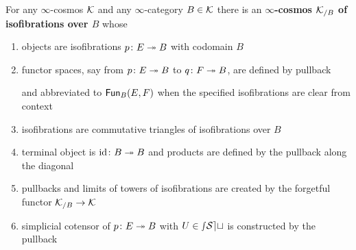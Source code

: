 \begin{proposition}\label{prop:sliced-cosmoi} 
  For any $\infty$-cosmos ${\mathord{\mathcal{K}}}$ and any $\infty$-cat\-e\-gory $B \in {\mathord{\mathcal{K}}}$ there is an \textbf{$\infty$-cosmos ${\mathord{\mathcal{K}}}_{/B}$ of isofibrations over $B$} whose
\begin{enumerate}
\item\label{itm:sliced-objects} objects are isofibrations $p \colon E \twoheadrightarrow B$ with codomain $B$
\item\label{itm:sliced-functor-space} functor spaces, say from $p \colon E \twoheadrightarrow B$ to $q \colon F \twoheadrightarrow B$, are defined by pullback
\begin{center}
\end{center}
and abbreviated to ${\mathord{\mathsf{Fun}}}_B(E,F)$ when the specified isofibrations are clear from context
\item\label{itm:sliced-isofibrations} isofibrations are commutative triangles of isofibrations over $B$
\begin{center}
\end{center}
\item\label{itm:sliced-products} terminal object is $\textup{id} \colon B \twoheadrightarrow B$ and products are defined by the pullback along the diagonal
\begin{center}
\end{center}
\item\label{itm:sliced-pullbacks} pullbacks and limits of towers of isofibrations are created by the forgetful functor ${\mathord{\mathcal{K}}}_{/B} \to {\mathord{\mathcal{K}}}$
\item\label{itm:sliced-cotensors} simplicial cotensor of $p \colon E \twoheadrightarrow B$ with $U \in {\mathord{\mathcal{sSet}}}$ is constructed by the pullback

\end{enumerate}
\end{proposition}
